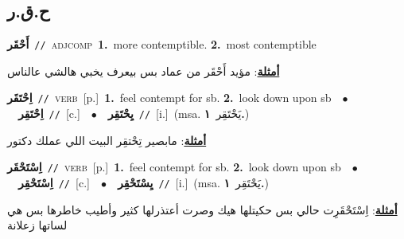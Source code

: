 \documentclass[10pt,a4paper,twoside]{article} %
\begin{document}
\begin{multicols}{2}
\vspace{-3mm}
\subsection*{\color{blue}\foreignlanguage{arabic}{ح.ق.ر}\color{blue}{}} 

{\setlength\topsep{0pt}\textbf{\foreignlanguage{arabic}{أَحْقَر}}\ {\color{gray}\texttt{//}\color{black}}\ \textsc{adj\textunderscore comp}\ \textbf{1.}~more contemptible.  \textbf{2.}~most contemptible\  \begin{flushright}\color{gray}\foreignlanguage{arabic}{\textbf{\underline{\foreignlanguage{arabic}{أمثلة}}}: مؤيد أَحْقَر من عماد بس بيعرف يخبي هالشي عالناس}\end{flushright}\color{black}} \vspace{2mm}

{\setlength\topsep{0pt}\textbf{\foreignlanguage{arabic}{اِحْتَقَر}}\ {\color{gray}\texttt{//}\color{black}}\ \textsc{verb}\ [p.]\ \textbf{1.}~feel contempt for sb.  \textbf{2.}~look down upon sb\ \ $\bullet$\ \ \setlength\topsep{0pt}\textbf{\foreignlanguage{arabic}{اِحْتَقِر}}\ {\color{gray}\texttt{//}\color{black}}\ [c.]\ \ $\bullet$\ \ \setlength\topsep{0pt}\textbf{\foreignlanguage{arabic}{يِحْتَقِر}}\ {\color{gray}\texttt{//}\color{black}}\ [i.]\ \color{gray}(msa. \foreignlanguage{arabic}{يَحْتَقِر}~\foreignlanguage{arabic}{\textbf{١.}})\color{black}\  \begin{flushright}\color{gray}\foreignlanguage{arabic}{\textbf{\underline{\foreignlanguage{arabic}{أمثلة}}}: مابصير تِحْتقِر البيت اللي عملك دكتور}\end{flushright}\color{black}} \vspace{2mm}

{\setlength\topsep{0pt}\textbf{\foreignlanguage{arabic}{اِسْتَحْقَر}}\ {\color{gray}\texttt{//}\color{black}}\ \textsc{verb}\ [p.]\ \textbf{1.}~feel contempt for sb.  \textbf{2.}~look down upon sb\ \ $\bullet$\ \ \setlength\topsep{0pt}\textbf{\foreignlanguage{arabic}{اِسْتَحْقِر}}\ {\color{gray}\texttt{//}\color{black}}\ [c.]\ \ $\bullet$\ \ \setlength\topsep{0pt}\textbf{\foreignlanguage{arabic}{يِسْتَحْقِر}}\ {\color{gray}\texttt{//}\color{black}}\ [i.]\ \color{gray}(msa. \foreignlanguage{arabic}{يَحْتَقِر}~\foreignlanguage{arabic}{\textbf{١.}})\color{black}\  \begin{flushright}\color{gray}\foreignlanguage{arabic}{\textbf{\underline{\foreignlanguage{arabic}{أمثلة}}}: اِسْتَحْقَرِت حالي بس حكيتلها هيك وصرت أعتذرلها كثير وأطيب خاطرها بس هي لساتها زعلانة}\end{flushright}\color{black}} \vspace{2mm}


\end{multicols}
\end{document}
